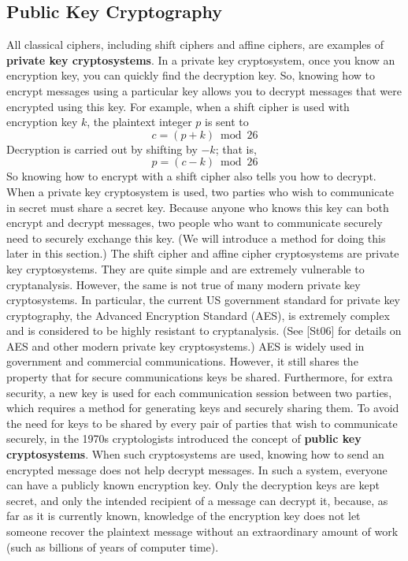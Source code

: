   \subsection {Public Key Cryptography}
All classical ciphers, including shift ciphers and affine ciphers, are examples of \textbf{private key
cryptosystems}. In a private key cryptosystem, once you know an encryption key, you can
quickly find the decryption key. So, knowing how to encrypt messages using a particular key
allows you to decrypt messages that were encrypted using this key. For example, when a shift
cipher is used with encryption key $k$, the plaintext integer $p$ is sent to
$$c=(p+k) \bmod 26$$
Decryption is carried out by shifting by $-k$; that is,
$$p=(c-k) \bmod 26$$
So knowing how to encrypt with a shift cipher also tells you how to decrypt.
When a private key cryptosystem is used, two parties who wish to communicate in secret
must share a secret key. Because anyone who knows this key can both encrypt and decrypt
messages, two people who want to communicate securely need to securely exchange this key.
(We will introduce a method for doing this later in this section.) The shift cipher and affine cipher
cryptosystems are private key cryptosystems. They are quite simple and are extremely vulnerable
to cryptanalysis. However, the same is not true of many modern private key cryptosystems. In
particular, the current US government standard for private key cryptography, the Advanced
Encryption Standard (AES), is extremely complex and is considered to be highly resistant to
cryptanalysis. (See [St06] for details on AES and other modern private key cryptosystems.)
AES is widely used in government and commercial communications. However, it still shares
the property that for secure communications keys be shared. Furthermore, for extra security, a
new key is used for each communication session between two parties, which requires a method
for generating keys and securely sharing them.
To avoid the need for keys to be shared by every pair of parties that wish to communicate
securely, in the 1970s cryptologists introduced the concept of \textbf{public key cryptosystems}. When
such cryptosystems are used, knowing how to send an encrypted message does not help decrypt
messages. In such a system, everyone can have a publicly known encryption key. Only the
decryption keys are kept secret, and only the intended recipient of a message can decrypt it,
because, as far as it is currently known, knowledge of the encryption key does not let someone
recover the plaintext message without an extraordinary amount of work (such as billions of
years of computer time).

